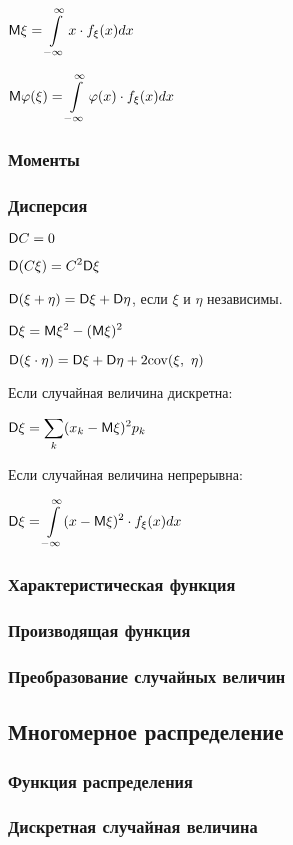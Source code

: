 $\displaystyle \mathsf{M}\xi = \int\limits_{-\infty}^{\infty} x\cdot f_\xi(x) dx $

$\displaystyle \mathsf{M}\varphi(\xi) = \int\limits_{-\infty}^{\infty} \varphi(x)\cdot f_\xi(x) dx $

\subsubsection{Моменты}
\subsubsection{Дисперсия}

$\displaystyle \mathsf{D} C = 0 $

$\displaystyle \mathsf{D}(C\xi) = C^2\mathsf{D}\xi $

$\displaystyle \mathsf{D}(\xi+\eta) = \mathsf{D}\xi + \mathsf{D}\eta $, если $\xi$ и $\eta$ независимы.

$\displaystyle \mathsf{D}\xi = \mathsf{M}\xi^2 - (\mathsf{M}\xi)^2 $

$\displaystyle \mathsf{D}(\xi\cdot\eta) = \mathsf{D}\xi + \mathsf{D}\eta + 2\mathrm{cov}(\xi,\ \eta) $

Если случайная величина дискретна:

$\displaystyle \mathsf{D}\xi = \sum_k (x_k - \mathsf{M}\xi)^2 p_k $

Если случайная величина непрерывна:

$\displaystyle \mathsf{D}\xi = \int\limits_{-\infty}^{\infty} (x-\mathsf{M}\xi)^2\cdot f_\xi(x) dx $


\subsubsection{Характеристическая функция}
\subsubsection{Производящая функция}
\subsubsection{Преобразование случайных величин}

\subsection{Многомерное распределение}

\subsubsection{Функция распределения}
\subsubsection{Дискретная случайная величина}
